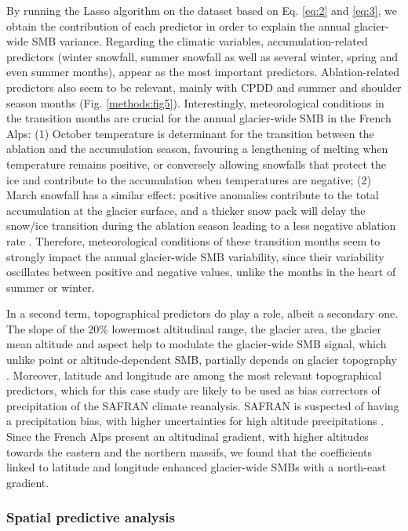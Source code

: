 By running the Lasso algorithm on the dataset based on Eq. \ref{eq:2} and \ref{eq:3}, we obtain the contribution of each predictor in order to explain the annual glacier-wide SMB variance. Regarding the climatic variables, accumulation-related predictors (winter snowfall, summer snowfall as well as several winter, spring and even summer months), appear as the most important predictors. Ablation-related predictors also seem to be relevant, mainly with CPDD and summer and shoulder season months (Fig. \ref{methods:fig5}). Interestingly, meteorological conditions in the transition months are crucial for the annual glacier-wide SMB in the French Alps: (1) October temperature is determinant for the transition between the ablation and the accumulation season, favouring a lengthening of melting when temperature remains positive, or conversely allowing snowfalls that protect the ice and contribute to the accumulation when temperatures are negative; (2) March snowfall has a similar effect: positive anomalies contribute to the total accumulation at the glacier surface, and a thicker snow pack will delay the snow/ice transition during the ablation season leading to a less negative ablation rate \citep[e.g. Fig. \ref{methods:fig6}b,][]{reveillet_relative_2018}. Therefore, meteorological conditions of these transition months seem to strongly impact the annual glacier-wide SMB variability, since their variability oscillates between positive and negative values, unlike the months in the heart of summer or winter. 

In a second term, topographical predictors do play a role, albeit a secondary one. The slope of the 20\% lowermost altitudinal range, the glacier area, the glacier mean altitude and aspect help to modulate the glacier-wide SMB signal, which unlike point or altitude-dependent SMB, partially depends on glacier topography \citep{huss_conventional_2012}. Moreover, latitude and longitude are among the most relevant topographical predictors, which for this case study are likely to be used as bias correctors of precipitation of the SAFRAN climate reanalysis. SAFRAN is suspected of having a precipitation bias, with higher uncertainties for high altitude precipitations \citep{vionnet_numerical_2016}. Since the French Alps present an altitudinal gradient, with higher altitudes towards the eastern and the northern massifs, we found that the coefficients linked to latitude and longitude enhanced glacier-wide SMBs with a north-east gradient. 

\subsubsection{Spatial predictive analysis}

